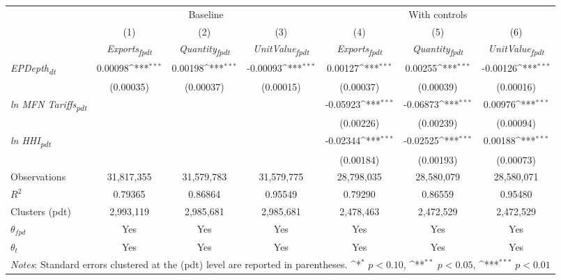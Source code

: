 {
\def\sym#1{\ifmmode^{#1}\else\(^{#1}\)\fi}
\begin{tabular}{l*{6}{c}}
\toprule
&\multicolumn{3}{c}{Baseline}&\multicolumn{3}{c}{With controls}\\\cmidrule(lr){2-4}\cmidrule(lr){5-7}
&(1)&(2)&(3)&(4)&(5)&(6)\\
&\textit{Exports\textsubscript{fpdt}}&\textit{Quantity\textsubscript{fpdt}}&\textit{UnitValue\textsubscript{fpdt}}&\textit{Exports\textsubscript{fpdt}}&\textit{Quantity\textsubscript{fpdt}}&\textit{UnitValue\textsubscript{fpdt}}\\
\midrule
\textit{EPDepth\textsubscript{dt}} & 0.00098\sym{***} & 0.00198\sym{***} & -0.00093\sym{***} & 0.00127\sym{***} & 0.00255\sym{***} & -0.00126\sym{***}\\
 & (0.00035) & (0.00037) & (0.00015) & (0.00037) & (0.00039) & (0.00016)\\
\addlinespace
\textit{ln MFN Tariffs\textsubscript{pdt}} &  &  &  & -0.05923\sym{***} & -0.06873\sym{***} & 0.00976\sym{***}\\
 &  &  &  & (0.00226) & (0.00239) & (0.00094)\\
\addlinespace
\textit{ln HHI\textsubscript{pdt}} &  &  &  & -0.02344\sym{***} & -0.02525\sym{***} & 0.00188\sym{***}\\
 &  &  &  & (0.00184) & (0.00193) & (0.00073)\\
\midrule
Observations & 31,817,355 & 31,579,783 & 31,579,775 & 28,798,035 & 28,580,079 & 28,580,071\\
$R^{2}$ & 0.79365 & 0.86864 & 0.95549 & 0.79290 & 0.86559 & 0.95480\\
Clusters (pdt) & 2,993,119 & 2,985,681 & 2,985,681 & 2,478,463 & 2,472,529 & 2,472,529\\
$\theta_{fpd}$ & Yes & Yes & Yes & Yes & Yes & Yes\\
$\theta_{t}$ & Yes & Yes & Yes & Yes & Yes & Yes\\
\bottomrule
\multicolumn{7}{l}{\footnotesize \textit{Notes}: Standard errors clustered at the (pdt) level are reported in parentheses. \sym{*} \(p<0.10\), \sym{**} \(p<0.05\), \sym{***} \(p<0.01\)}\\
\end{tabular}
}
